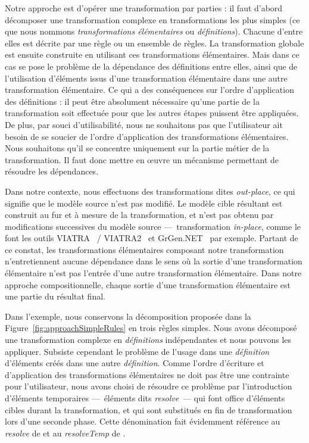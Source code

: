 Notre approche est d'opérer une transformation par parties : il faut d'abord
décomposer une transformation complexe en transformations les plus simples (ce
que nous nommons \emph{transformations élémentaires} ou \emph{définitions}).
Chacune d'entre elles est décrite par une règle ou un ensemble de règles. La
transformation globale est ensuite construite en utilisant ces transformations
élémentaires. Mais dans ce cas se pose le problème de la dépendance des
définitions entre elles, ainsi que de l'utilisation d'éléments issus d'une
transformation élémentaire dans une autre transformation élémentaire. Ce qui a
des conséquences sur l'ordre d'application des définitions : il peut être
absolument nécessaire qu'une partie de la transformation soit effectuée pour
que les autres étapes puissent être appliquées. De plus, par souci
d'utilisabilité, nous ne souhaitons pas que l'utilisateur ait besoin de se
soucier de l'ordre d'application des transformations élémentaires. Nous
souhaitons qu'il se concentre uniquement sur la partie métier de la
transformation. Il faut donc mettre en œuvre un mécanisme permettant de
résoudre les dépendances.

Dans notre contexte, nous effectuons des transformations dites
\emph{out-place}, ce qui signifie que le modèle source n'est pas modifié. Le
modèle cible résultant est construit au fur et à mesure de la transformation,
et n'est pas obtenu par modifications successives du modèle source
---~transformation \emph{in-place}, comme le font les outils
VIATRA~\cite{Varro2002} / VIATRA2~\cite{Varro2007} et
GrGen.NET~\cite{Jakumeit2010} par exemple. Partant de ce constat, les
transformations élémentaires composant notre transformation n'entretiennent
aucune dépendance dans le sens où la sortie d'une transformation élémentaire
n'est pas l'entrée d'une autre transformation élémentaire. Dans notre approche
compositionnelle, chaque sortie d'une transformation élémentaire est une partie
du résultat final.


Dans l'exemple, nous conservons la décomposition proposée dans la
Figure~\ref{fig:approachSimpleRules} en trois règles simples. Nous avons
décomposé une transformation complexe en \emph{définitions} indépendantes et
nous pouvons les appliquer. Subsiste cependant le problème de l'usage dans une
\emph{définition} d'éléments créés dans une autre \emph{définition}. Comme
l'ordre d'écriture et d'application des transformations élémentaires ne doit
pas être une contrainte pour l'utilisateur, nous avons choisi de résoudre ce
problème par l'introduction d'éléments temporaires ---~éléments dits
\emph{resolve}~--- qui font office d'éléments cibles durant la transformation,
et qui sont substitués en fin de transformation lors d'une seconde phase. Cette
dénomination fait évidemment référence au \emph{resolve} de {\qvt} et au
\emph{resolveTemp} de {\atl}.

